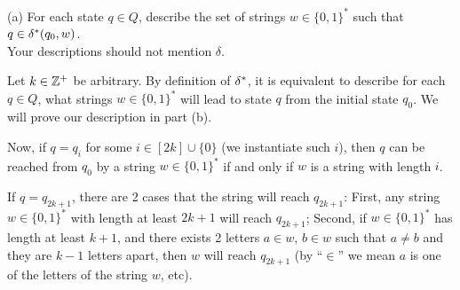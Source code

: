 \documentclass[11pt, sakura, night, 1in]{hw}
\begin{document}

(a) For each state $q \in Q$, describe the set of strings $w \in \{0,1\}^*$ such that $q \in  \delta^*(q_0, w)$.\\
Your descriptions should not mention $\delta$.

 Let $k\in\mathbb{Z}^+$ be arbitrary. By definition of $\delta^*$, it is equivalent to describe for each $q\in Q$, what strings $w\in\{0,1\}^*$ will lead to state $q$ from the initial state $q_0$. We will prove our description in part (b).

Now, if $q=q_i$ for some $i\in[2k]\cup\{0\}$ (we instantiate such $i$), then $q$ can be reached from $q_0$ by a string $w\in\{0,1\}^*$ if and only if $w$ is a string with length $i$.

If $q=q_{2k+1}$, there are 2 cases that the string will reach $q_{2k+1}$: First, any string $w\in\{0,1\}^*$ with length at least $2k+1$ will reach $q_{2k+1}$; Second, if $w\in\{0,1\}^*$ has length at least $k+1$, and there exists 2 letters $a\in w$, $b\in w$ such that $a\ne b$ and they are $k-1$ letters apart, then $w$ will reach $q_{2k+1}$ (by ``$\in$'' we mean $a$ is one of the letters of the string $w$, etc).
\end{document}
